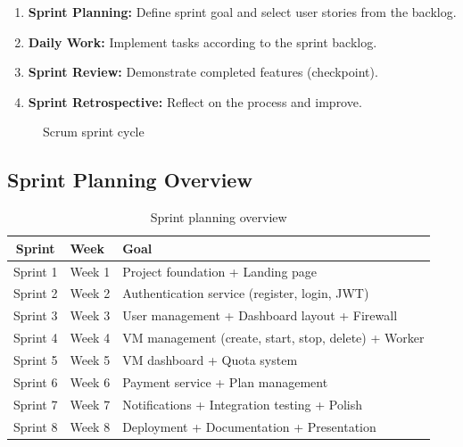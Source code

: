 \begin{enumerate}
  \item \textbf{Sprint Planning:} Define sprint goal and select user stories from the backlog.
  \item \textbf{Daily Work:} Implement tasks according to the sprint backlog.
  \item \textbf{Sprint Review:} Demonstrate completed features (checkpoint).
  \item \textbf{Sprint Retrospective:} Reflect on the process and improve.
\end{enumerate}

\begin{figure}[H]
\centering
{}
\caption{Scrum sprint cycle}
\label{fig:scrum-cycle}
\end{figure}

\subsection{Sprint Planning Overview}

\begin{table}[H]
\centering
\caption{Sprint planning overview}
\label{tab:sprint-plan}
\begin{tabularx}{\textwidth}{|c|l|X|}
\hline
\rowcolor{blue!15}
\textbf{Sprint} & \textbf{Week} & \textbf{Goal} \\
\hline
Sprint 1 & Week 1 & Project foundation + Landing page \\
\hline
Sprint 2 & Week 2 & Authentication service (register, login, JWT) \\
\hline
Sprint 3 & Week 3 & User management + Dashboard layout + Firewall \\
\hline
Sprint 4 & Week 4 & VM management (create, start, stop, delete) + Worker \\
\hline
Sprint 5 & Week 5 & VM dashboard + Quota system \\
\hline
Sprint 6 & Week 6 & Payment service + Plan management \\
\hline
Sprint 7 & Week 7 & Notifications + Integration testing + Polish \\
\hline
Sprint 8 & Week 8 & Deployment + Documentation + Presentation \\
\hline
\end{tabularx}
\end{table}

